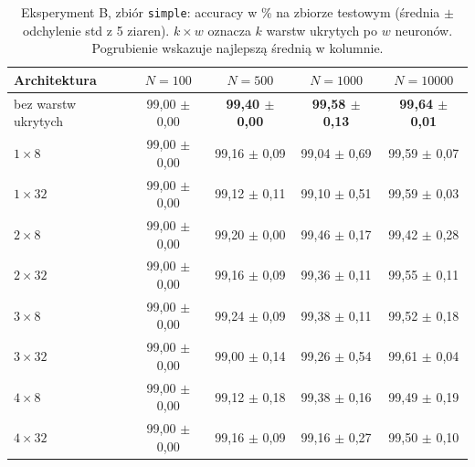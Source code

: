 \documentclass[11pt,a4paper]{article}
\begin{document}
	\begin{table}[H]
		\centering
		\footnotesize
		\caption{Eksperyment B, zbiór \texttt{simple}: accuracy w \% na zbiorze testowym (średnia $\pm$ odchylenie std z 5 ziaren). $k\times w$ oznacza $k$ warstw ukrytych po $w$ neuronów. Pogrubienie wskazuje najlepszą średnią w kolumnie.}\label{tab:B_simple}
		\begin{tabular}{@{}lcccc@{}}
			\toprule
			Architektura & $N=100$ & $N=500$ & $N=1000$ & $N=10000$ \\
			\midrule
			bez warstw ukrytych & 99,00 $\pm$ 0,00 & \textbf{99,40 $\pm$ 0,00} & \textbf{99,58 $\pm$ 0,13} & \textbf{99,64 $\pm$ 0,01} \\
			$1\times8$ & 99,00 $\pm$ 0,00 & 99,16 $\pm$ 0,09 & 99,04 $\pm$ 0,69 & 99,59 $\pm$ 0,07 \\
			$1\times32$ & 99,00 $\pm$ 0,00 & 99,12 $\pm$ 0,11 & 99,10 $\pm$ 0,51 & 99,59 $\pm$ 0,03 \\
			$2\times8$ & 99,00 $\pm$ 0,00 & 99,20 $\pm$ 0,00 & 99,46 $\pm$ 0,17 & 99,42 $\pm$ 0,28 \\
			$2\times32$ & 99,00 $\pm$ 0,00 & 99,16 $\pm$ 0,09 & 99,36 $\pm$ 0,11 & 99,55 $\pm$ 0,11 \\
			$3\times8$ & 99,00 $\pm$ 0,00 & 99,24 $\pm$ 0,09 & 99,38 $\pm$ 0,11 & 99,52 $\pm$ 0,18 \\
			$3\times32$ & 99,00 $\pm$ 0,00 & 99,00 $\pm$ 0,14 & 99,26 $\pm$ 0,54 & 99,61 $\pm$ 0,04 \\
			$4\times8$ & 99,00 $\pm$ 0,00 & 99,12 $\pm$ 0,18 & 99,38 $\pm$ 0,16 & 99,49 $\pm$ 0,19 \\
			$4\times32$ & 99,00 $\pm$ 0,00 & 99,16 $\pm$ 0,09 & 99,16 $\pm$ 0,27 & 99,50 $\pm$ 0,10 \\
			\bottomrule
		\end{tabular}
	\end{table}
	
\end{document}
